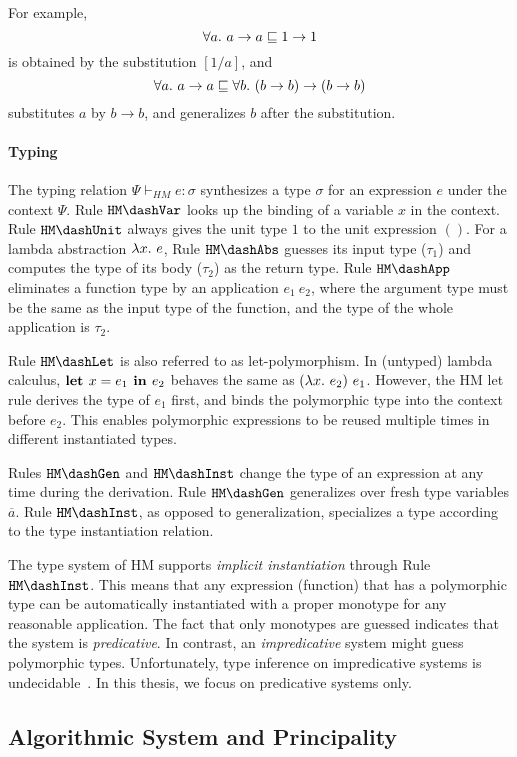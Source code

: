 For example, $$\all a \to a \sqsubseteq 1 \to 1$$
is obtained by the substitution $[1/a]$, and
$$\all a \to a \sqsubseteq \all[b] (b \to b) \to (b \to b)$$
substitutes $a$ by $b \to b$, and generalizes $b$ after the substitution.


\paragraph{Typing}
The typing relation $\Psi \vdash_{HM} e:\sigma$ synthesizes a type $\sigma$ for
an expression $e$ under the context $\Psi$.
Rule $\mathtt{HM \dash Var}$ looks up the binding of a variable $x$ in the context.
Rule $\mathtt{HM \dash Unit}$ always gives the unit type $1$ to the unit expression $()$.
For a lambda abstraction $\lam e$, Rule $\mathtt{HM \dash Abs}$ guesses its input type ($\tau_1$)
and computes the type of its body ($\tau_2$) as the return type.
Rule $\mathtt{HM \dash App}$ eliminates a function type by an application $e_1~e_2$,
where the argument type must be the same as the input type of the function,
and the type of the whole application is $\tau_2$.

Rule $\mathtt{HM \dash Let}$ is also referred to as let-polymorphism.
In (untyped) lambda calculus, $\textbf{let } x={e_1} \textbf{ in } {e_2}$ behaves the same as $(\lam e_2)~e_1$.
However, the HM let rule derives the type of $e_1$ first,
and binds the polymorphic type into the context before $e_2$.
This enables polymorphic expressions to be reused multiple times in different instantiated types.

Rules $\mathtt{HM \dash Gen}$ and $\mathtt{HM \dash Inst}$ change the type of an expression
at any time during the derivation.
Rule $\mathtt{HM \dash Gen}$ generalizes over fresh type variables $\overline{a}$.
Rule $\mathtt{HM \dash Inst}$, as opposed to generalization, specializes a type
according to the type instantiation relation.

The type system of HM supports \emph{implicit instantiation} through
Rule $\mathtt{HM \dash Inst}$.
This means that any expression (function) that has a polymorphic type
can be automatically instantiated with a proper monotype for any reasonable application.
The fact that only monotypes are guessed indicates that the system is \emph{predicative}.
In contrast, an \emph{impredicative} system might guess polymorphic types.
Unfortunately, type inference on impredicative systems is undecidable~\citep{wells1999typability}.
In this thesis, we focus on predicative systems only.

\subsection{Algorithmic System and Principality}

